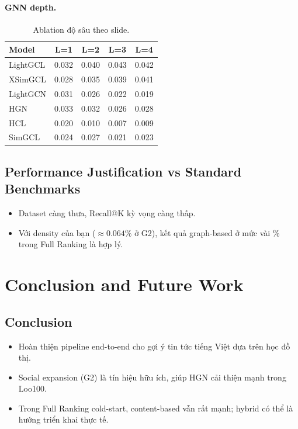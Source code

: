 \documentclass[11pt]{article}
\begin{document}
\paragraph{GNN depth.}
\begin{table}[t]
\centering
\small
\begin{tabular}{l c c c c}
\toprule
\textbf{Model} & \textbf{L=1} & \textbf{L=2} & \textbf{L=3} & \textbf{L=4}\\
\midrule
LightGCL & 0.032 & 0.040 & 0.043 & 0.042\\
XSimGCL  & 0.028 & 0.035 & 0.039 & 0.041\\
LightGCN & 0.031 & 0.026 & 0.022 & 0.019\\
HGN      & 0.033 & 0.032 & 0.026 & 0.028\\
HCL      & 0.020 & 0.010 & 0.007 & 0.009\\
SimGCL   & 0.024 & 0.027 & 0.021 & 0.023\\
\bottomrule
\end{tabular}
\caption{Ablation độ sâu theo slide.}
\label{tab:ablation-depth}
\end{table}

\subsection{Performance Justification vs Standard Benchmarks}
\begin{itemize}
  \item Dataset càng thưa, Recall@K kỳ vọng càng thấp.
  \item Với density của bạn ($\approx 0.064\%$ ở G2), kết quả graph-based ở mức vài \% trong Full Ranking là hợp lý.
\end{itemize}

\section{Conclusion and Future Work}
\label{sec:conclusion}

\subsection{Conclusion}
\begin{itemize}
  \item Hoàn thiện pipeline end-to-end cho gợi ý tin tức tiếng Việt dựa trên học đồ thị.
  \item Social expansion (G2) là tín hiệu hữu ích, giúp HGN cải thiện mạnh trong Loo100.
  \item Trong Full Ranking cold-start, content-based vẫn rất mạnh; hybrid có thể là hướng triển khai thực tế.
\end{itemize}
\end{document}
